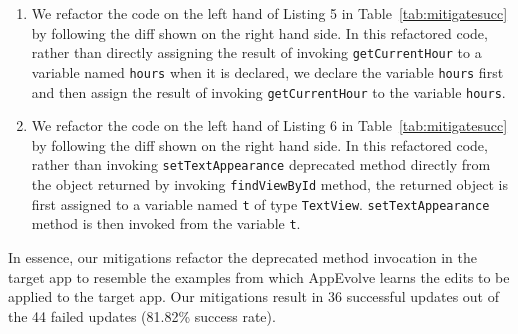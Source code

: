 \begin{enumerate}
\item We refactor the code on the left hand of Listing 5 in  Table~\ref{tab:mitigatesucc} by following the diff shown on the right hand side. In this refactored code, rather than directly assigning the result of invoking {\tt getCurrentHour} to a variable named {\tt hours} when it is declared, we declare the variable {\tt hours} first and then assign the result of invoking {\tt getCurrentHour} to the variable {\tt hours}.

\item We refactor the code on the left hand of Listing 6 in Table~\ref{tab:mitigatesucc} by following the diff shown on the right hand side. In this refactored code, rather than invoking {\tt setTextAppearance} deprecated method directly from the object returned by invoking {\tt findViewById} method, the returned object is first assigned to a variable named {\tt t} of type {\tt TextView}. {\tt setTextAppearance} method is then invoked from the variable {\tt t}.

\end{enumerate}

In essence, our mitigations refactor the deprecated method invocation in the target app to resemble the examples from which AppEvolve learns the edits to be applied to the target app. Our mitigations result in 36 successful updates out of the 44 failed updates (81.82\% success rate).

